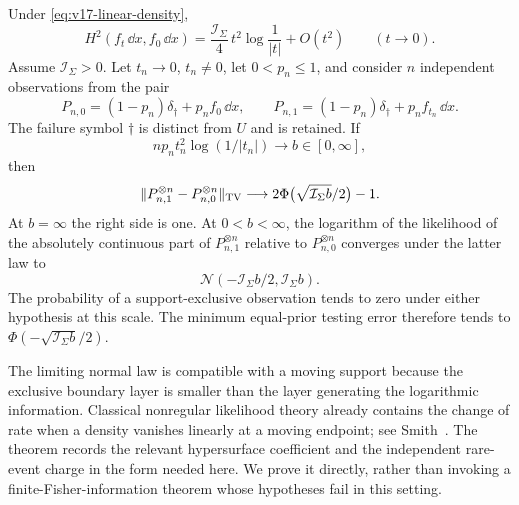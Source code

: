 \begin{theorem}
\label{thm:v17-boundary-information}
Under \eqref{eq:v17-linear-density},
\begin{equation}\label{eq:v17-hellinger}
 H^2(f_t\,\dd x,f_0\,\dd x)
       =\frac{\mathcal I_\Sigma}{4}\,t^2\log\frac1{|t|}
                                                    +O(t^2)
                      \qquad(t\longrightarrow0).
\end{equation}
Assume $\mathcal I_\Sigma>0$. Let $t_n\to0$, $t_n\ne0$, let
$0<p_n\le1$, and consider $n$ independent observations from the pair
\begin{equation}\label{eq:v17-thinning}
 P_{n,0}=(1-p_n)\delta_\dagger+p_n f_0\,\dd x,
 \qquad
 P_{n,1}=(1-p_n)\delta_\dagger+p_n f_{t_n}\,\dd x.
\end{equation}
The failure symbol $\dagger$ is distinct from $U$ and is retained.
If
\begin{equation}\label{eq:v17-information-scale}
        n p_n t_n^2\log(1/|t_n|)\longrightarrow b\in[0,\infty],
\end{equation}
then
\begin{equation}\label{eq:v17-general-testing}
 \|P_{n,1}^{\otimes n}-P_{n,0}^{\otimes n}\|_{\rm TV}
        \longrightarrow
            2\Phi\bigl(\sqrt{\mathcal I_\Sigma b}/2\bigr)-1.
\end{equation}
At $b=\infty$ the right side is one. At $0<b<\infty$, the logarithm
of the likelihood of the absolutely continuous part of
$P_{n,1}^{\otimes n}$ relative to $P_{n,0}^{\otimes n}$ converges under
the latter law to
\begin{equation}\label{eq:v17-general-likelihood}
             \mathcal N(-\mathcal I_\Sigma b/2,\mathcal I_\Sigma b).
\end{equation}
The probability of a support-exclusive observation tends to zero under
either hypothesis at this scale. The minimum equal-prior testing error
therefore tends to $\Phi(-\sqrt{\mathcal I_\Sigma b}/2)$.
\end{theorem}

The limiting normal law is compatible with a moving support because the
exclusive boundary layer is smaller than the layer generating the
logarithmic information. Classical nonregular likelihood theory already
contains the change of rate when a density vanishes linearly at a moving
endpoint; see Smith~\cite{Smith1985}. The theorem records the relevant
hypersurface coefficient and the independent rare-event charge in the
form needed here. We prove it directly, rather than invoking a
finite-Fisher-information theorem whose hypotheses fail in this setting.

